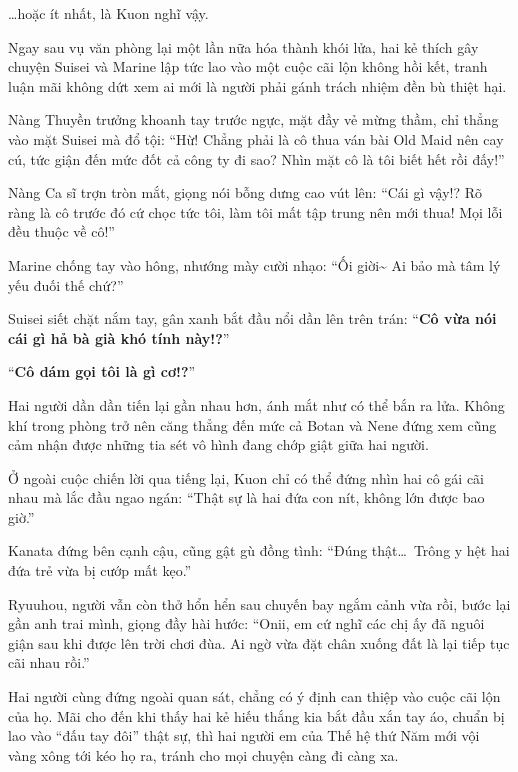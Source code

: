 \documentclass[../main.tex]{subfiles}
\begin{document}
\omk

\dots hoặc ít nhất, là Kuon nghĩ vậy.

Ngay sau vụ văn phòng \hll{} lại một lần nữa hóa thành khói lửa, hai kẻ thích gây chuyện Suisei và Marine lập tức lao vào một cuộc cãi lộn không hồi kết, tranh luận mãi không dứt xem ai mới là người phải gánh trách nhiệm đền bù thiệt hại.

Nàng Thuyền trưởng khoanh tay trước ngực, mặt đầy vẻ mừng thầm, chỉ thẳng vào mặt Suisei mà đổ tội: ``Hừ! Chẳng phải là cô thua ván bài Old Maid nên cay cú, tức giận đến mức đốt cả công ty đi sao? Nhìn mặt cô là tôi biết hết rồi đấy!''

Nàng Ca sĩ trợn tròn mắt, giọng nói bỗng dưng cao vút lên: ``Cái gì vậy!? Rõ ràng là cô trước đó cứ chọc tức tôi, làm tôi mất tập trung nên mới thua! Mọi lỗi đều thuộc về cô!''

Marine chống tay vào hông, nhướng mày cười nhạo: ``Ối giời\~{} Ai bảo mà tâm lý yếu đuối thế chứ?''

Suisei siết chặt nắm tay, gân xanh bắt đầu nổi dần lên trên trán: ``\textbf{Cô vừa nói cái gì hả bà già khó tính này!?}''

``\textbf{Cô dám gọi tôi là gì cơ!?}''

Hai người dần dần tiến lại gần nhau hơn, ánh mắt như có thể bắn ra lửa. Không khí trong phòng trở nên căng thẳng đến mức cả Botan và Nene đứng xem cũng cảm nhận được những tia sét vô hình đang chớp giật giữa hai người.

Ở ngoài cuộc chiến lời qua tiếng lại, Kuon chỉ có thể đứng nhìn hai cô gái cãi nhau mà lắc đầu ngao ngán: ``Thật sự là hai đứa con nít, không lớn được bao giờ.''

Kanata đứng bên cạnh cậu, cũng gật gù đồng tình: ``Đúng thật\dots\ Trông y hệt hai đứa trẻ vừa bị cướp mất kẹo.''

Ryuuhou, người vẫn còn thở hổn hển sau chuyến bay ngắm cảnh vừa rồi, bước lại gần anh trai mình, giọng đầy hài hước: ``Onii, em cứ nghĩ các chị ấy đã nguôi giận sau khi được lên trời chơi đùa. Ai ngờ vừa đặt chân xuống đất là lại tiếp tục cãi nhau rồi.''

Hai người cùng đứng ngoài quan sát, chẳng có ý định can thiệp vào cuộc cãi lộn của họ. Mãi cho đến khi thấy hai kẻ hiếu thắng kia bắt đầu xắn tay áo, chuẩn bị lao vào ``đấu tay đôi'' thật sự, thì hai người em của Thế hệ thứ Năm mới vội vàng xông tới kéo họ ra, tránh cho mọi chuyện càng đi càng xa.
\end{document}
